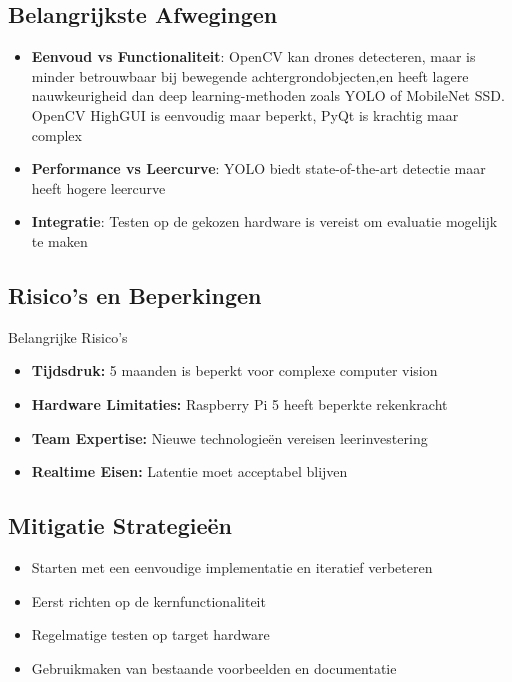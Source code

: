 \documentclass[11pt,a4paper]{scrartcl}
\begin{document}
\subsection{Belangrijkste Afwegingen}
\begin{itemize}[leftmargin=*]
    \item \textbf{Eenvoud vs Functionaliteit}: OpenCV kan drones detecteren, maar is minder betrouwbaar bij bewegende achtergrondobjecten,en heeft lagere nauwkeurigheid dan deep learning-methoden zoals YOLO of MobileNet SSD.
    \newline OpenCV HighGUI is eenvoudig maar beperkt, PyQt is krachtig maar complex
    
    \item \textbf{Performance vs Leercurve}: YOLO biedt state-of-the-art detectie maar heeft hogere leercurve
    \item \textbf{Integratie}: Testen op de gekozen hardware is vereist om evaluatie mogelijk te maken
\end{itemize}

\subsection{Risico's en Beperkingen}
\begin{infobox}{Belangrijke Risico's}
\begin{itemize}[leftmargin=*,nosep]
    \item \textbf{Tijdsdruk:} 5 maanden is beperkt voor complexe computer vision
    \item \textbf{Hardware Limitaties:} Raspberry Pi 5 heeft beperkte rekenkracht
    \item \textbf{Team Expertise:} Nieuwe technologieën vereisen leerinvestering
    \item \textbf{Realtime Eisen:} Latentie moet acceptabel blijven
\end{itemize}
\end{infobox}

\subsection{Mitigatie Strategieën}
\begin{itemize}[leftmargin=*]
    \item Starten met een eenvoudige implementatie en iteratief verbeteren
    \item Eerst richten op de kernfunctionaliteit
    \item Regelmatige testen op target hardware
    \item Gebruikmaken van bestaande voorbeelden en documentatie
\end{itemize}
\end{document}
